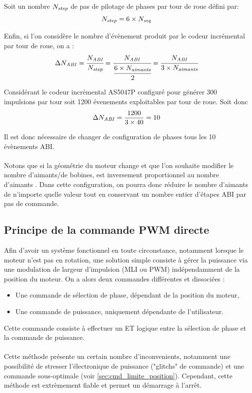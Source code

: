 Soit un nombre $N_\mathit{step}$ de pas de pilotage de phases par tour de roue défini par:
$$N_\mathit{step} = 6 \times N_\mathit{seq}$$

Enfin, si l'on considère \nabi le nombre d'évènement produit par le codeur incrémental par tour de roue, on a :
$$\Delta N_\mathit{ABI} = \cfrac{N_\mathit{ABI}}{N_\mathit{step}} = \cfrac{N_\mathit{ABI}}{\cfrac{6\times N_\mathit{aimants}}{2}} = \cfrac{N_\mathit{ABI}}{3\times N_\mathit{aimants}}$$

Considérant le codeur incrémental AS5047P configuré pour générer 300 impulsions par tour soit 1200 évenements exploitables par tour de roue.
Soit donc 
$$\Delta N_\mathit{ABI} = \frac{1200}{3\times40} = 10$$

Il est donc nécessaire de changer de configuration de phases tous les 10 évènements ABI.

\paragraph{}
Notons que si la géométrie du moteur change et que l'on souhaite modifier le nombre d'aimants/de bobines, \dnabi est inversement proportionnel au nombre d'aimants \naimants.
Dans cette configuration, on pourra donc réduire le nombre d'aimants de n'importe quelle valeur tout en conservant un nombre entier d'étapes ABI par pas de commande.

\subsection{Principe de la commande PWM directe}

Afin d'avoir un système fonctionnel en toute circonstance, notamment lorsque le moteur n'est pas en rotation, 
une solution simple consiste à gérer la puissance via une modulation de largeur d'impulsion (MLI ou PWM) indépendamment de la position du moteur.
On a alors deux commandes différentes et dissociées :
\begin{itemize}
    \item Une commande de sélection de phase, dépendant de la position du moteur,
    \item Une commande de puissance, uniquement dépendante de l'utilisateur.
\end{itemize}

Cette commande consiste à effectuer un ET logique entre la sélection de phase et la commande de puissance.

\paragraph{}
Cette méthode présente un certain nombre d'inconvenients, notamment une possibilité de stresser l'électronique de puissance ("glitchs" de commande) et une commande sous-optimale (voir \cref{sec:cmd_limite_position}).
Cependant, cette méthode est extrèmement fiable et permet un démarrage à l'arrêt. 

